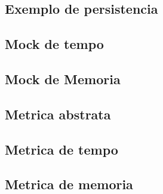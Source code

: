 \documentclass[12pt]{tcc}
\begin{document}
\begin{appendices}
\subsection{Exemplo de persistencia}


\subsection{Mock de tempo}


\subsection{Mock de Memoria}


\subsection{Metrica abstrata}


\subsection{Metrica de tempo}


\subsection{Metrica de memoria}

\end{appendices}
\end{document}
